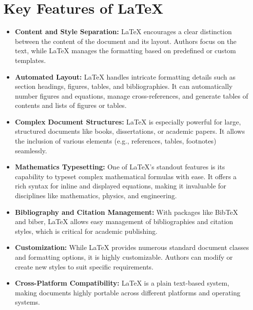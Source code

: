 \documentclass[12pt, a4paper]{article}
\begin{document}
\section*{\textcolor{blue!60}{\Huge Key Features of LaTeX}}
\vspace{0.8cm}
\begin{itemize}
    \item \textbf{Content and Style Separation:} \textmd{LaTeX encourages a clear distinction between the content of the document and its layout. Authors focus on the text, while LaTeX manages the formatting based on predefined or custom templates.}
\newpage
{}
\vspace{-0.9cm}   
    \item \textbf{Automated Layout:} \textmd{LaTeX handles intricate formatting details such as section headings, figures, tables, and bibliographies. It can automatically number figures and equations, manage cross-references, and generate tables of contents and lists of figures or tables.}

    \item \textbf{Complex Document Structures:} \textmd{LaTeX is especially powerful for large, structured documents like books, dissertations, or academic papers. It allows the inclusion of various elements (e.g., references, tables, footnotes) seamlessly.}
\vspace{0.4cm}
    \item \textbf{Mathematics Typesetting:} \textmd{One of LaTeX’s standout features is its capability to typeset complex mathematical formulas with ease. It offers a rich syntax for inline and displayed equations, making it invaluable for disciplines like mathematics, physics, and engineering.}
\vspace{0.4cm}
    \item \textbf{Bibliography and Citation Management:} \textmd{With packages like BibTeX and biber, LaTeX allows easy management of bibliographies and citation styles, which is critical for academic publishing.}
\vspace{0.4cm}   
    \item \textbf{Customization:} \textmd{While LaTeX provides numerous standard document classes and formatting options, it is highly customizable. Authors can modify or create new styles to suit specific requirements.}
\vspace{0.4cm}  
    \item \textbf{Cross-Platform Compatibility:} \textmd{LaTeX is a plain text-based system, making documents highly portable across different platforms and operating systems.}
\end{itemize}
\newpage
{}
\vspace{-0.9cm}  
\end{document}
